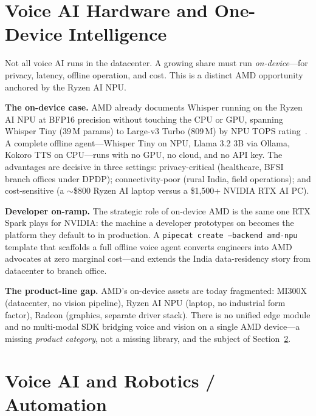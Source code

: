 \documentclass[blind]{gtac}
\begin{document}
\section{Voice AI Hardware and One-Device Intelligence}
\label{sec:onedevice}

Not all voice AI runs in the datacenter. A growing share must run \emph{on-device}---for privacy, latency, offline operation, and cost. This is a distinct AMD opportunity anchored by the Ryzen AI NPU.

\textbf{The on-device case.} AMD already documents Whisper running on the Ryzen AI NPU at BFP16 precision without touching the CPU or GPU, spanning Whisper Tiny (39\,M params) to Large-v3 Turbo (809\,M) by NPU TOPS rating~\cite{amd_ryzen_whisper}. A complete offline agent---Whisper Tiny on NPU, Llama 3.2 3B via Ollama, Kokoro TTS on CPU---runs with no GPU, no cloud, and no API key. The advantages are decisive in three settings: privacy-critical (healthcare, BFSI branch offices under DPDP); connectivity-poor (rural India, field operations); and cost-sensitive (a $\sim$\$800 Ryzen AI laptop versus a \$1{,}500+ NVIDIA RTX AI PC).

\textbf{Developer on-ramp.} The strategic role of on-device AMD is the same one RTX Spark plays for NVIDIA: the machine a developer prototypes on becomes the platform they default to in production. A \texttt{pipecat create --backend amd-npu} template that scaffolds a full offline voice agent converts engineers into AMD advocates at zero marginal cost---and extends the India data-residency story from datacenter to branch office.

\textbf{The product-line gap.} AMD's on-device assets are today fragmented: MI300X (datacenter, no vision pipeline), Ryzen AI NPU (laptop, no industrial form factor), Radeon (graphics, separate driver stack). There is no unified edge module and no multi-modal SDK bridging voice and vision on a single AMD device---a missing \emph{product category}, not a missing library, and the subject of Section~\ref{sec:robotics}.

\section{Voice AI and Robotics / Automation}
\label{sec:robotics}
\end{document}
